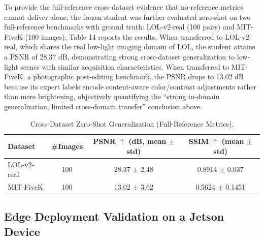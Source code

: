 \documentclass[sensors,article,submit,moreauthors]{Definitions/mdpi}
\begin{document}
To provide the full-reference cross-dataset evidence that no-reference metrics cannot deliver alone, the frozen student was further evaluated zero-shot on two full-reference benchmarks with ground truth: LOL-v2-real \cite{ref32} (100 pairs) and MIT-FiveK \cite{ref33} (100 images); Table 14 reports the results. When transferred to LOL-v2-real, which shares the real low-light imaging domain of LOL, the student attains a PSNR of 28.37 dB, demonstrating strong cross-dataset generalization to low-light scenes with similar acquisition characteristics. When transferred to MIT-FiveK, a photographic post-editing benchmark, the PSNR drops to 13.02 dB because its expert labels encode content-aware color/contrast adjustments rather than mere brightening, objectively quantifying the ``strong in-domain generalization, limited cross-domain transfer'' conclusion above.

\begin{table}[H]
\caption{Cross-Dataset Zero-Shot Generalization (Full-Reference Metrics).\label{tab14}}
\begin{tabularx}{\textwidth}{LCCC}
\toprule
\textbf{Dataset}	& \textbf{\#Images}	& \textbf{PSNR $\uparrow$ (dB, mean $\pm$ std)}	& \textbf{SSIM $\uparrow$ (mean $\pm$ std)}\\
\midrule
LOL-v2-real \cite{ref32}	& 100	& 28.37 $\pm$ 2.48	& 0.8914 $\pm$ 0.037\\
MIT-FiveK \cite{ref33}	& 100	& 13.02 $\pm$ 3.62	& 0.5624 $\pm$ 0.1451\\
\bottomrule
\end{tabularx}
\end{table}

\subsection{Edge Deployment Validation on a Jetson Device}
\end{document}
